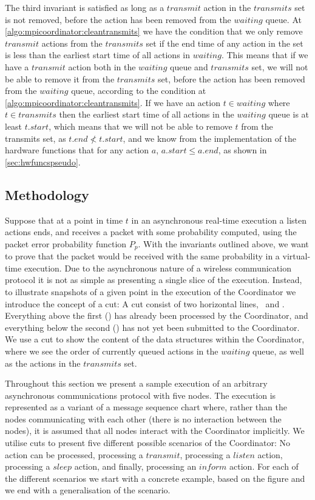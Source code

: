 The third invariant is satisfied as long as a $transmit$ action in the $transmits$ set is not removed, before the action has been removed from the $waiting$ queue. At \autoref{algo:mpicoordinator:cleantransmits} we have the condition that we only remove $transmit$ actions from the $transmits$ set if the end time of any action in the set is less than the earliest start time of all actions in $waiting$. This means that if we have a $transmit$ action both in the $waiting$ queue and $transmits$ set, we will not be able to remove it from the $transmits$ set, before the action has been removed from the $waiting$ queue, according to the condition at \autoref{algo:mpicoordinator:cleantransmits}. If we have an action $t \in waiting$ where $t \in transmits$ then the earliest start time of all actions in the $waiting$ queue is at least $t.start$, which means that we will not be able to remove $t$ from the transmits set, as $t.end \nless t.start$, and we know from the implementation of the hardware functions that for any action $a$, $a.start \leq a.end$, as shown in \autoref{sec:hwfuncspseudo}.

\subsection{Methodology}\label{sec:correctnessmethods}
Suppose that at a point in time $t$ in an asynchronous real-time execution a listen actions ends, and receives a packet with some probability computed, using the packet error probability function $P_p$. With the invariants outlined above, we want to prove that the packet would be received with the same probability in a virtual-time execution. Due to the asynchronous nature of a wireless communication protocol it is not as simple as presenting a single slice of the execution. Instead, to illustrate snapshots of a given point in the execution of the Coordinator we introduce the concept of a cut: A cut consist of two horizontal lines, \ProcessedLine\ and \SubmittedLine. Everything above the first (\ProcessedLine) has already been processed by the Coordinator, and everything below the second (\SubmittedLine) has not yet been submitted to the Coordinator. We use a cut to show the content of the data structures within the Coordinator, where we see the order of currently queued actions in the $waiting$ queue, as well as the actions in the $transmits$ set. \medbreak

Throughout this section we present a sample execution of an arbitrary asynchronous communications protocol with five nodes. The execution is represented as a variant of a message sequence chart where, rather than the nodes communicating with each other (there is no interaction between the nodes), it is assumed that all nodes interact with the Coordinator implicitly. We utilise cuts to present five different possible scenarios of the Coordinator: No action can be processed, processing a $transmit$, processing a $listen$ action, processing a $sleep$ action, and finally, processing an $inform$ action. For each of the different scenarios we start with a concrete example, based on the figure and we end with a generalisation of the scenario.

